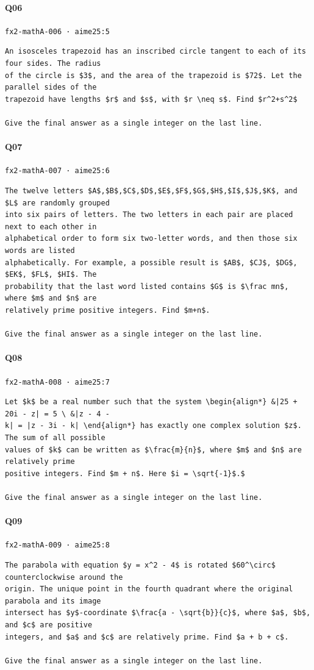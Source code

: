 \documentclass[10pt]{article}
\begin{document}
\paragraph{Q06} \texttt{fx2-mathA-006  ·  aime25:5}
\begin{verbatim}
An isosceles trapezoid has an inscribed circle tangent to each of its four sides. The radius
of the circle is $3$, and the area of the trapezoid is $72$. Let the parallel sides of the
trapezoid have lengths $r$ and $s$, with $r \neq s$. Find $r^2+s^2$

Give the final answer as a single integer on the last line.
\end{verbatim}
\paragraph{Q07} \texttt{fx2-mathA-007  ·  aime25:6}
\begin{verbatim}
The twelve letters $A$,$B$,$C$,$D$,$E$,$F$,$G$,$H$,$I$,$J$,$K$, and $L$ are randomly grouped
into six pairs of letters. The two letters in each pair are placed next to each other in
alphabetical order to form six two-letter words, and then those six words are listed
alphabetically. For example, a possible result is $AB$, $CJ$, $DG$, $EK$, $FL$, $HI$. The
probability that the last word listed contains $G$ is $\frac mn$, where $m$ and $n$ are
relatively prime positive integers. Find $m+n$.

Give the final answer as a single integer on the last line.
\end{verbatim}
\paragraph{Q08} \texttt{fx2-mathA-008  ·  aime25:7}
\begin{verbatim}
Let $k$ be a real number such that the system \begin{align*} &|25 + 20i - z| = 5 \ &|z - 4 -
k| = |z - 3i - k| \end{align*} has exactly one complex solution $z$. The sum of all possible
values of $k$ can be written as $\frac{m}{n}$, where $m$ and $n$ are relatively prime
positive integers. Find $m + n$. Here $i = \sqrt{-1}$.$

Give the final answer as a single integer on the last line.
\end{verbatim}
\paragraph{Q09} \texttt{fx2-mathA-009  ·  aime25:8}
\begin{verbatim}
The parabola with equation $y = x^2 - 4$ is rotated $60^\circ$ counterclockwise around the
origin. The unique point in the fourth quadrant where the original parabola and its image
intersect has $y$-coordinate $\frac{a - \sqrt{b}}{c}$, where $a$, $b$, and $c$ are positive
integers, and $a$ and $c$ are relatively prime. Find $a + b + c$.

Give the final answer as a single integer on the last line.
\end{verbatim}
\end{document}
